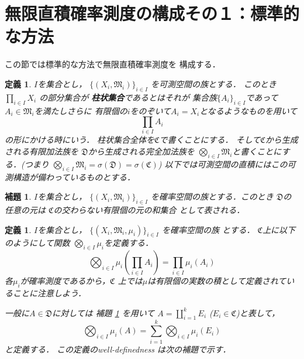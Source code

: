 \documentclass[leqno, a4paper, 12pt]{jsarticle}
\newtheorem{lem}[thm]{補題}
\newtheorem{df}[thm]{定義}
\begin{document}
\section{無限直積確率測度の構成その１：標準的な方法}
この節では標準的な方法で無限直積確率測度を
構成する．

\begin{df}
$I$を集合とし，
$\{(X_{i}, \mathfrak{M}_{i})\}_{i\in I}$
を可測空間の族とする．
このとき$\prod_{i\in I}X_{i}$
の部分集合が
\textbf{柱状集合}であるとはそれが
集合族$\{A_{i}\}_{i\in I}$であって
$A_{i}\in \mathfrak{M}_{i}$を満たしさらに
有限個の$i$をのぞいて$A_{i}=X_{i}$となるようなものを用いて
\[
\prod_{i\in I}A_{i}
\]
の形にかける時にいう．
柱状集合全体を$\mathfrak{C}$で書くことにする．
そして$\mathfrak{C}$から生成される有限加法族を
$\mathfrak{D}$から生成される完全加法族を
$\bigotimes_{i\in I}\mathfrak{M}_{i}$と書くことにする．(つまり
$\bigotimes_{i\in I}\mathfrak{M}_{i}=\sigma(\mathfrak{D})=\sigma(\mathfrak{C})$)
以下では可測空間の直積にはこの可測構造が備わっているものとする．

\end{df}


\begin{lem}\label{lem:finiteunion}
$I$を集合とし，
$\{(X_{i}, \mathfrak{M}_{i})\}_{i\in I}$
を確率空間の族とする．このとき
$\mathfrak{D}$の任意の元は
$\mathfrak{C}$の交わらない有限個の元の和集合
として表される．
\end{lem}

\begin{df}
$I$を集合とし，
$\{(X_{i}, \mathfrak{M}_{i}, \mu_{i})\}_{i\in I}$
を確率空間の族
とする．
$\mathfrak{C}$上に以下のようにして関数
$\bigotimes_{i\in I}\mu_{i}$を定義する．
\[
\bigotimes_{i\in I}\mu_{i}\left(\prod_{i\in I}A_{i}\right)=
\prod_{i\in I}\mu_{i}(A_{i})
\]
各$\mu_{i}$が確率測度であるから，$\mathfrak{C}$
上では$\mu$は有限個の実数の積として定義されていることに注意しよう．

一般に$A\in \mathfrak{D}$に対しては
補題 \ref{lem:finiteunion} を用いて
$A=\coprod_{i=1}^{k}E_{i}$ ($E_{i}\in \mathfrak{C}$)と表して，
\[
\bigotimes_{i\in I}\mu_{i}(A)=
\sum_{i=1}^{k}\bigotimes_{i\in I}\mu_{i}(E_{i})
\]
と定義する．
この定義のwell-definedness
は次の補題で示す．
\end{df}
\end{document}
